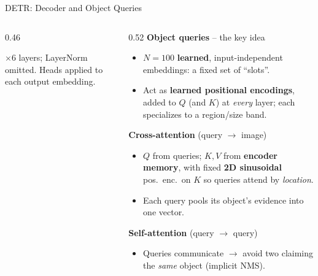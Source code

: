 \begin{frame}[fragile]{DETR: Decoder and Object Queries}
\begin{columns}[T]
\begin{column}{0.46\textwidth}
\begin{center}
      \end{center}
      \vspace{0.1em}
      {\footnotesize $\times 6$ layers; LayerNorm omitted. Heads applied to each output embedding.}
    \end{column}
    \begin{column}{0.52\textwidth}
      \textbf{Object queries} -- the key idea
      \begin{itemize}
        \item $N{=}100$ \textbf{learned}, input-independent embeddings: a fixed set of ``slots''.
        \item Act as \textbf{learned positional encodings}, added to $Q$ (and $K$) at \emph{every} layer; each specializes to a region/size band.
      \end{itemize}

      \vspace{0.2em}
      \textbf{Cross-attention} (query $\to$ image)
      \begin{itemize}
        \item $Q$ from queries; $K,V$ from \textbf{encoder memory}, with fixed \textbf{2D sinusoidal} pos.\ enc.\ on $K$ so queries attend by \emph{location}.
        \item Each query pools its object's evidence into one vector.
      \end{itemize}

      \vspace{0.2em}
      \textbf{Self-attention} (query $\to$ query)
      \begin{itemize}
        \item Queries communicate $\to$ avoid two claiming the \emph{same} object (implicit NMS).
      \end{itemize}
    \end{column}
  \end{columns}


\end{frame}
